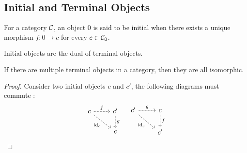 \subsection{Initial and Terminal Objects}

\begin{definition}
  For a category $\mathcal{C}$, an object $0$ is said to be initial when there exists a
  unique morphism $f: 0\to c$ for every $c\in \mathcal{C}_0$.
  \parencite{awodey:category_theory}
\end{definition}

\begin{remark}
  Initial objects are the dual of terminal objects.
\end{remark}

\begin{theorem}\label{thm:initial_object_iso} If
  there are multiple terminal objects in a category, then they are all
  isomorphic.

  \begin{proof}
    Consider two initial objects $c$ and $c'$, the following diagrams must
    commute :
    \[\begin{tikzcd}
      c & {c'} \\
      & c
      \arrow["{\id_c}"', dashed, from=1-1, to=2-2]
      \arrow["f", dashed, from=1-1, to=1-2]
      \arrow["g", dashed, from=1-2, to=2-2]
    \end{tikzcd}
    \quad
    \begin{tikzcd}
      {c'} & c \\
      & {c'}
      \arrow["{\id_c}"', dashed, from=1-1, to=2-2]
      \arrow["g", dashed, from=1-1, to=1-2]
      \arrow["f", dashed, from=1-2, to=2-2]
    \end{tikzcd}\]
  \end{proof}
\end{theorem}

